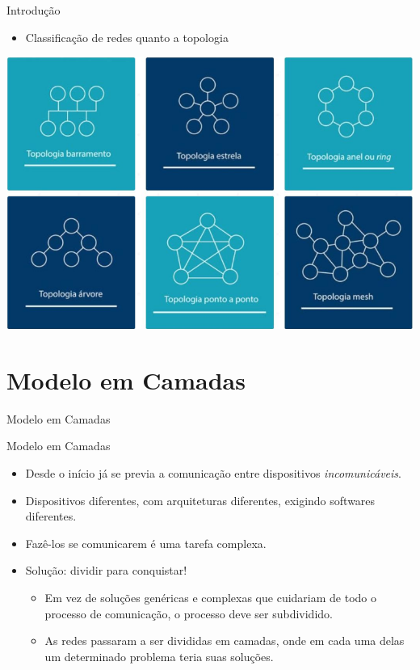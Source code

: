 \documentclass{libs/ufc_format}
\begin{document}
\begin{frame}{Introdução}
    \begin{itemize}
        \item Classificação de redes quanto a topologia
    \end{itemize}
    \centering
    \includegraphics[width=\textwidth]{media/redes_topologia}
\end{frame}

\section{Modelo em Camadas}

\begin{frame}{}
    \centering
    \Large
    Modelo em Camadas
\end{frame}


\begin{frame}{Modelo em Camadas}
    \begin{itemize}
        \justifying
        \item Desde o início já se previa a comunicação entre dispositivos \textit{incomunicáveis}.
        \item Dispositivos diferentes, com arquiteturas diferentes, exigindo softwares diferentes.
        \item Fazê-los se comunicarem é uma tarefa complexa.
        \item<2-> Solução: dividir para conquistar!
            \begin{itemize}
                \justifying
                \item<3-> Em vez de soluções genéricas e complexas que cuidariam de todo o processo de comunicação, o processo deve ser subdividido.
                \item<4-> As redes passaram a ser divididas em camadas, onde em cada uma delas um determinado problema teria suas soluções.
            \end{itemize}
    \end{itemize}
\end{frame}
\end{document}
